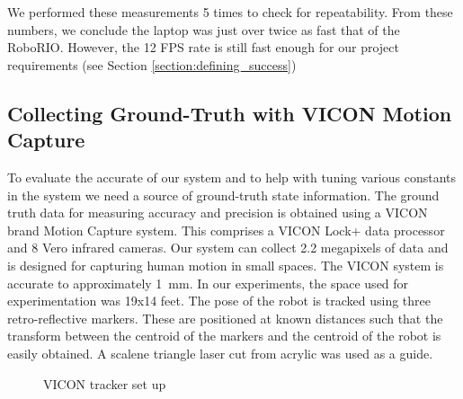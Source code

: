 \documentclass{article}
\begin{document}
    We performed these measurements 5 times to check for repeatability. From these numbers, we conclude the laptop was just over twice as fast that of the RoboRIO. However, the 12 FPS rate is still fast enough for our project requirements (see Section \ref{section:defining_success})

  \subsection{Collecting Ground-Truth with VICON Motion Capture} \label{section:mocap}

    To evaluate the accurate of our system and to help with tuning various constants in the system we need a source of ground-truth state information. The ground truth data for measuring accuracy and precision is obtained using a VICON brand Motion Capture system. This comprises a VICON Lock+ data processor and 8 Vero infrared cameras. Our system can collect 2.2 megapixels of data and is designed for capturing human motion in small spaces. The VICON system is accurate to approximately \SI{1}{\milli\meter}. In our experiments, the space used for experimentation was 19x14 feet. The pose of the robot is tracked using three retro-reflective markers. These are positioned at known distances such that the transform between the centroid of the markers and the centroid of the robot is easily obtained. A scalene triangle laser cut from acrylic was used as a guide.

    \begin{figure}[H]%
        \centering
        \qquad
        \caption{VICON tracker set up}%
        \label{fig:viconSetup}%
    \end{figure}
\end{document}
